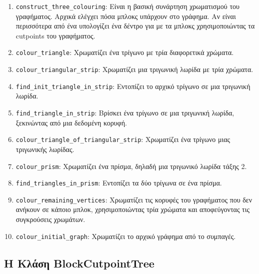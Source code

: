 \begin{enumerate}
	\item \texttt{construct\_three\_colouring}: Είναι η βασική συνάρτηση χρωματισμού του γραφήματος. Αρχικά ελέγχει πόσα μπλοκς υπάρχουν στο γράφημα. Αν είναι περισσότερα από ένα υπολογίζει ένα δέντρο για με τα μπλοκς χρησιμοποιώντας τα cutpoints του γραφήματος.
	
	\item \texttt{colour\_triangle}: Χρωματίζει ένα τρίγωνο με τρία διαφορετικά χρώματα.
	
	\item \texttt{colour\_triangular\_strip}: Χρωματίζει μια τριγωνική λωρίδα με τρία χρώματα.
	
	\item \texttt{find\_init\_triangle\_in\_strip}: Εντοπίζει το αρχικό τρίγωνο σε μια τριγωνική λωρίδα.
	
	\item \texttt{find\_triangle\_in\_strip}: Βρίσκει ένα τρίγωνο σε μια τριγωνική λωρίδα, ξεκινώντας από μια δεδομένη κορυφή.
	
	\item \texttt{colour\_triangle\_of\_triangular\_strip}: Χρωματίζει ένα τρίγωνο μιας τριγωνικής λωρίδας.
	
	\item \texttt{colour\_prism}: Χρωματίζει ένα πρίσμα, δηλαδή μια τριγωνικό λωρίδα τάξης 2.
	
	\item \texttt{find\_triangles\_in\_prism}: Εντοπίζει τα δύο τρίγωνα σε ένα πρίσμα.
	
	\item \texttt{colour\_remaining\_vertices}: Χρωματίζει τις κορυφές του γραφήματος που δεν ανήκουν σε κάποιο μπλοκ, χρησιμοποιώντας τρία χρώματα και αποφεύγοντας τις συγκρούσεις χρωμάτων.
	
	\item \texttt{colour\_initial\_graph}: Χρωματίζει το αρχικό γράφημα από το συμπαγές. 
		
\end{enumerate}

\subsection{H Kλάση BlockCutpointTree}





